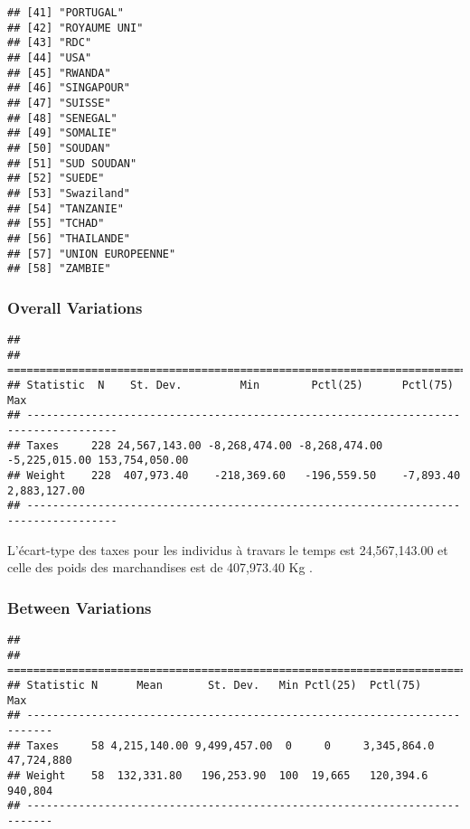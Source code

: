 \documentclass[
]{book}
\begin{document}
\begin{verbatim}
## [41] "PORTUGAL"                                
## [42] "ROYAUME UNI"                             
## [43] "RDC"                                     
## [44] "USA"                                     
## [45] "RWANDA"                                  
## [46] "SINGAPOUR"                               
## [47] "SUISSE"                                  
## [48] "SENEGAL"                                 
## [49] "SOMALIE"                                 
## [50] "SOUDAN"                                  
## [51] "SUD SOUDAN"                              
## [52] "SUEDE"                                   
## [53] "Swaziland"                               
## [54] "TANZANIE"                                
## [55] "TCHAD"                                   
## [56] "THAILANDE"                               
## [57] "UNION EUROPEENNE"                        
## [58] "ZAMBIE"
\end{verbatim}

\hypertarget{overall-variations}{%
\subsubsection{Overall Variations}\label{overall-variations}}

\begin{verbatim}
## 
## ====================================================================================
## Statistic  N    St. Dev.         Min        Pctl(25)      Pctl(75)         Max      
## ------------------------------------------------------------------------------------
## Taxes     228 24,567,143.00 -8,268,474.00 -8,268,474.00 -5,225,015.00 153,754,050.00
## Weight    228  407,973.40    -218,369.60   -196,559.50    -7,893.40    2,883,127.00 
## ------------------------------------------------------------------------------------
\end{verbatim}

L'écart-type des taxes pour les individus à travars le temps est 24,567,143.00 et celle des poids des marchandises est de 407,973.40 Kg .

\hypertarget{between-variations}{%
\subsubsection{Between Variations}\label{between-variations}}

\begin{verbatim}
## 
## ==========================================================================
## Statistic N      Mean       St. Dev.   Min Pctl(25)  Pctl(75)      Max    
## --------------------------------------------------------------------------
## Taxes     58 4,215,140.00 9,499,457.00  0     0     3,345,864.0 47,724,880
## Weight    58  132,331.80   196,253.90  100  19,665   120,394.6   940,804  
## --------------------------------------------------------------------------
\end{verbatim}
\end{document}
